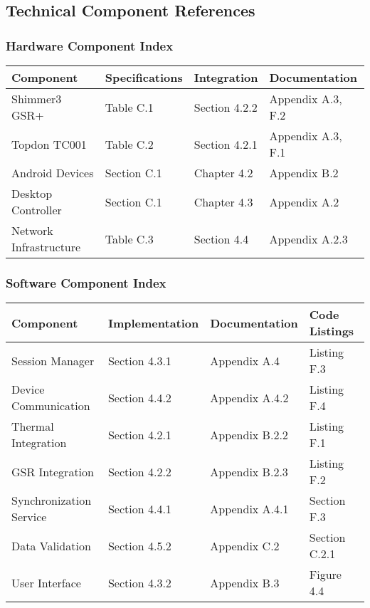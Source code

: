 \subsection{Technical Component References}

\subsubsection{Hardware Component Index}

\begin{longtable}{|l|l|l|p{5cm}|}
\hline
\textbf{Component} & \textbf{Specifications} & \textbf{Integration} & \textbf{Documentation} \\
\hline
\endhead
Shimmer3 GSR+ & Table C.1 & Section 4.2.2 & Appendix A.3, F.2 \\
Topdon TC001 & Table C.2 & Section 4.2.1 & Appendix A.3, F.1 \\
Android Devices & Section C.1 & Chapter 4.2 & Appendix B.2 \\
Desktop Controller & Section C.1 & Chapter 4.3 & Appendix A.2 \\
Network Infrastructure & Table C.3 & Section 4.4 & Appendix A.2.3 \\
\hline
\end{longtable}

\subsubsection{Software Component Index}

\begin{longtable}{|l|l|l|p{5cm}|}
\hline
\textbf{Component} & \textbf{Implementation} & \textbf{Documentation} & \textbf{Code Listings} \\
\hline
\endhead
Session Manager & Section 4.3.1 & Appendix A.4 & Listing F.3 \\
Device Communication & Section 4.4.2 & Appendix A.4.2 & Listing F.4 \\
Thermal Integration & Section 4.2.1 & Appendix B.2.2 & Listing F.1 \\
GSR Integration & Section 4.2.2 & Appendix B.2.3 & Listing F.2 \\
Synchronization Service & Section 4.4.1 & Appendix A.4.1 & Section F.3 \\
Data Validation & Section 4.5.2 & Appendix C.2 & Section C.2.1 \\
User Interface & Section 4.3.2 & Appendix B.3 & Figure 4.4 \\
\hline
\end{longtable}

